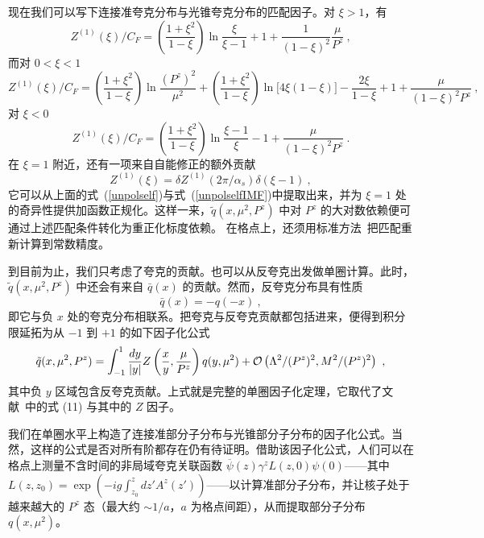 现在我们可以写下连接准夸克分布与光锥夸克分布的匹配因子。对 $\xi>1$，有
\begin{equation}
   Z^{(1)}(\xi)/C_F = \left(\frac{1+\xi^2}{1-\xi}\right)\ln \frac{\xi}{\xi-1} + 1 + \frac{1}{(1-\xi)^2}\frac{\mu}{P^z}  \ ,
\end{equation}
而对 $0<\xi<1$
\begin{equation}
   Z^{(1)}(\xi)/C_F = \left(\frac{1+\xi^2}{1-\xi}\right)\ln \frac{(P^z)^2}{\mu^2}+\left(\frac{1+\xi^2}{1-\xi}\right)\ln\big[{4\xi(1-\xi)}\big]-\frac{2\xi}{1-\xi}+1+\frac{\mu}{(1-\xi)^2P^z} \ ,
\end{equation}
对 $\xi<0$
\begin{equation}
   Z^{(1)}(\xi)/C_F = \left(\frac{1+\xi^2}{1-\xi}\right)\ln \frac{\xi-1}{\xi}-1 +\frac{\mu}{(1-\xi)^2P^z} \ .
\end{equation}
在 $\xi=1$ 附近，还有一项来自自能修正的额外贡献
\begin{equation}
    Z^{(1)}(\xi) = \delta Z^{(1)}(2\pi/\alpha_s) \delta(\xi-1)\ ,
\end{equation}
它可以从上面的式~(\ref{unpolself})与式~(\ref{unpolselfIMF})中提取出来，并为 $\xi=1$ 处的奇异性提供加函数正规化。这样一来，$\tilde q(x,\mu^2,P^z)$ 中对 $P^z$ 的大对数依赖便可通过上述匹配条件转化为重正化标度依赖。
在格点上，还须用标准方法~\cite{ren}把匹配重新计算到常数精度。

到目前为止，我们只考虑了夸克的贡献。也可以从反夸克出发做单圈计算。此时，$\tilde q(x, \mu^2, P^z)$ 中还会有来自 $\bar q(x)$ 的贡献。然而，反夸克分布具有性质
\begin{equation}
     \bar q(x) = - q(-x)\ ,
\end{equation}
即它与负 $x$ 处的夸克分布相联系。把夸克与反夸克贡献都包括进来，便得到积分限延拓为从 $-1$ 到 $+1$ 的如下因子化公式
\begin{equation}\label{1loopfact}
    \tilde q(x, \mu^2, P^z)  = \int^1_{-1} \frac{dy}{|y|} Z\left(\frac{x}{y},\frac{\mu}{P^z}\right) q(y, \mu^2) +  {\cal O}\left(\Lambda^2/(P^z)^2,  M^2/(P^z)^2\right)\ ,
\end{equation}
其中负 $y$ 区域包含反夸克贡献。上式就是完整的单圈因子化定理，它取代了文献~\cite{Ji:2013dva}中的式 (11) 与其中的 $Z$ 因子。

我们在单圈水平上构造了连接准部分子分布与光锥部分子分布的因子化公式。当然，这样的公式是否对所有阶都存在仍有待证明。借助该因子化公式，人们可以在格点上测量不含时间的非局域夸克关联函数 $\overline{\psi}(z)\gamma^zL(z,0)\psi(0)$——其中
$L(z,z_0) = \exp\left(-ig\int^{z}_{z_0} dz' A^z(z') \right)$——以计算准部分子分布，并让核子处于越来越大的 $P^z$ 态（最大约 $\sim 1/a$，$a$ 为格点间距），从而提取部分子分布 $q(x,\mu^2)$。
